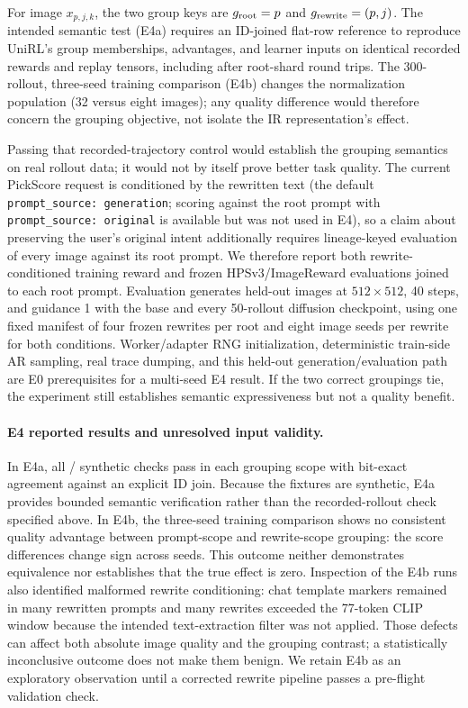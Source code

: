 \documentclass[10pt]{article}
\begin{document}
For image $x_{p,j,k}$, the two group keys are $g_{\rm root}=p$ and $g_{\rm rewrite}=(p,j)$.
The intended semantic test (E4a) requires an ID-joined flat-row reference to reproduce UniRL's group memberships, advantages, and learner inputs on identical recorded rewards and replay tensors, including after root-shard round trips.
The 300-rollout, three-seed training comparison (E4b) changes the normalization population (32 versus eight images); any quality difference would therefore concern the grouping objective, not isolate the IR representation's effect.

Passing that recorded-trajectory control would establish the grouping semantics on real rollout data; it would not by itself prove better task quality.
The current PickScore request is conditioned by the rewritten text (the default \texttt{prompt\_source: generation}; scoring against the root prompt with \texttt{prompt\_source: original} is available but was not used in E4), so a claim about preserving the user's original intent additionally requires lineage-keyed evaluation of every image against its root prompt.
We therefore report both rewrite-conditioned training reward and frozen HPSv3/ImageReward evaluations joined to each root prompt.
Evaluation generates held-out images at $512\times512$, 40 steps, and guidance 1 with the base and every 50-rollout diffusion checkpoint, using one fixed manifest of four frozen rewrites per root and eight image seeds per rewrite for both conditions.
Worker/adapter RNG initialization, deterministic train-side AR sampling, real trace dumping, and this held-out generation/evaluation path are E0 prerequisites for a multi-seed E4 result.
If the two correct groupings tie, the experiment still establishes semantic expressiveness but not a quality benefit.

\paragraph{E4 reported results and unresolved input validity.}
In E4a, all \EFourChecks/\EFourChecks{} synthetic checks pass in each grouping scope with bit-exact agreement against an explicit ID join.
Because the fixtures are synthetic, E4a provides bounded semantic verification rather than the recorded-rollout check specified above.
In E4b, the three-seed training comparison shows no consistent quality advantage between prompt-scope and rewrite-scope grouping: the score differences change sign across seeds.
This outcome neither demonstrates equivalence nor establishes that the true effect is zero.
Inspection of the E4b runs also identified malformed rewrite conditioning: chat template markers remained in many rewritten prompts and many rewrites exceeded the 77-token CLIP window because the intended text-extraction filter was not applied.
Those defects can affect both absolute image quality and the grouping contrast; a statistically inconclusive outcome does not make them benign.
We retain E4b as an exploratory observation until a corrected rewrite pipeline passes a pre-flight validation check.
\end{document}
